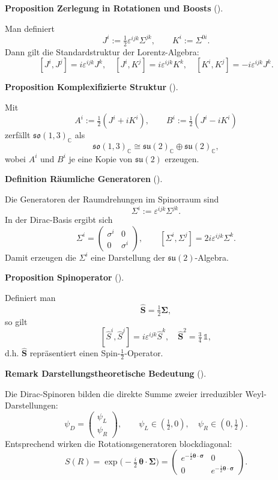 \documentclass[10pt, letterpaper]{article}
\newcommand{\C}{\mathbb{C}}
\newcommand{\CustomHeading}[3]{%
  \par\medskip\noindent%
  \textbf{#1 #2} \textnormal{(#3)}.\enskip%
}
\newenvironment{DEF}[2]{\begin{unitbox}\CustomHeading{Definition}{#1}{#2}}{\end{unitbox}}
\newenvironment{PROP}[2]{\begin{unitbox}\CustomHeading{Proposition}{#1}{#2}}{\end{unitbox}}
\newenvironment{REM}[2]{\begin{unitbox}\CustomHeading{Remark}{#1}{#2}}{\end{unitbox}}
\begin{document}
\begin{PROP}{Zerlegung in Rotationen und Boosts}{}
Man definiert
\[
J^i := \tfrac{1}{2}\varepsilon^{ijk}\Sigma^{jk},
\qquad
K^i := \Sigma^{0i}.
\]
Dann gilt die Standardstruktur der Lorentz-Algebra:
\[
[J^i,J^j]=i\varepsilon^{ijk}J^k, \quad
[J^i,K^j]=i\varepsilon^{ijk}K^k, \quad
[K^i,K^j]=-i\varepsilon^{ijk}J^k.
\]
\end{PROP}

\begin{PROP}{Komplexifizierte Struktur}{}
Mit
\[
A^i := \tfrac{1}{2}(J^i+iK^i),
\qquad
B^i := \tfrac{1}{2}(J^i-iK^i)
\]
zerfällt $\mathfrak{so}(1,3)_{\C}$ als
\[
\boxed{
\mathfrak{so}(1,3)_{\C} \cong \mathfrak{su}(2)_{\C} \oplus \mathfrak{su}(2)_{\C},
}
\]
wobei $A^i$ und $B^i$ je eine Kopie von $\mathfrak{su}(2)$ erzeugen.
\end{PROP}

\begin{DEF}{Räumliche Generatoren}{}
Die Generatoren der Raumdrehungen im Spinorraum sind
\[
\Sigma^i := \varepsilon^{ijk}\Sigma^{jk}.
\]
In der Dirac-Basis ergibt sich
\[
\boxed{
\Sigma^i =
\begin{pmatrix}
\sigma^i & 0\\[3pt]
0 & \sigma^i
\end{pmatrix}},
\qquad
[\Sigma^i,\Sigma^j] = 2i\varepsilon^{ijk}\Sigma^k.
\]
Damit erzeugen die $\Sigma^i$ eine Darstellung der $\mathfrak{su}(2)$-Algebra.
\end{DEF}

\begin{PROP}{Spinoperator}{}
Definiert man
\[
\hat{\mathbf{S}} = \tfrac{1}{2}\boldsymbol{\Sigma},
\]
so gilt
\[
[\hat{S}^i,\hat{S}^j] = i\varepsilon^{ijk}\hat{S}^k,
\quad
\hat{\mathbf{S}}^2 = \tfrac{3}{4}\,\mathbb{1},
\]
d.h. $\hat{\mathbf{S}}$ repräsentiert einen Spin-$\tfrac{1}{2}$-Operator.
\end{PROP}

\begin{REM}{Darstellungstheoretische Bedeutung}{}
Die Dirac-Spinoren bilden die direkte Summe zweier irreduzibler Weyl-Darstellungen:
\[
\psi_D =
\begin{pmatrix}
\psi_L \\[3pt] \psi_R
\end{pmatrix},
\qquad
\psi_L\in(\tfrac{1}{2},0),\quad
\psi_R\in(0,\tfrac{1}{2}).
\]
Entsprechend wirken die Rotationsgeneratoren blockdiagonal:
\[
S(R) = \exp\!\Big(-\tfrac{i}{2}\,\boldsymbol{\theta}\cdot\boldsymbol{\Sigma}\Big)
=
\begin{pmatrix}
e^{-\frac{i}{2}\boldsymbol{\theta}\cdot\boldsymbol{\sigma}} & 0\\[3pt]
0 & e^{-\frac{i}{2}\boldsymbol{\theta}\cdot\boldsymbol{\sigma}}
\end{pmatrix}.
\]
\end{REM}
\end{document}
